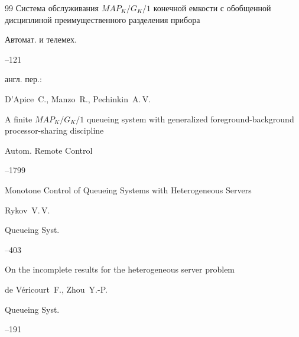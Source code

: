 \begin{thebibliography}{99}
\paper Система обслуживания $M\!AP_K/G_K/1$ конечной емкости с обобщенной дисциплиной преимущественного разделения прибора

\jour Автомат. и телемех.



--121



\transl англ. пер.:~

\by D'Apice~C., Manzo~R., Pechinkin~A.\,V.

\paper A finite $M\!AP_K/G_K/1$ queueing system with generalized foreground-background processor-sharing discipline

\jour Autom. Remote Control




--1799






\paper Monotone Control of Queueing Systems with Heterogeneous Servers

\by    Rykov~V.\,V.

\jour Queueing Syst.




--403




\paper On the incomplete results for the heterogeneous server problem

\by    de V\'ericourt~F., Zhou~Y.-P.

\jour Queueing Syst.




--191




\end{thebibliography}
